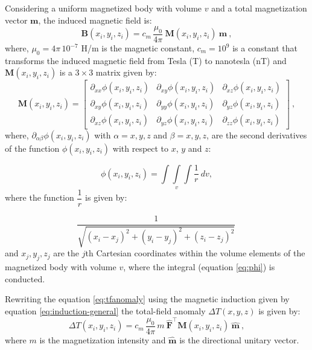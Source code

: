 Considering a uniform magnetized body with volume $v$ and a total magnetization vector $\mathbf{m}$, the induced magnetic field is:
\begin{equation}
	\mathbf{B}(x_i, y_i, z_i) = c_{m} \, \frac{\mu_{0}}{4\pi} \: \mathbf{M}(x_i, y_i, z_i) \: 
	\mathbf{m} \: ,
	\label{eq:induction-general}
\end{equation}
where, $\mu_{0} = 4\pi \, 10^{-7}$ H/m is the magnetic constant, 
$c_{m} = 10^{9}$ is a constant that transforms the induced magnetic field from Tesla (T) to nanotesla (nT) and 
$\mathbf{M}(x_i, y_i, z_i)$ is a $3 \times 3$ matrix given by:
\begin{equation}
	\mathbf{M}(x_i, y_i, z_i) =
	\left[
	\begin{array}{ccc}
		\partial_{xx} \phi(x_i,y_i,z_i) & \partial_{xy} \phi(x_i,y_i,z_i) & 
		\partial_{xz} \phi(x_i,y_i,z_i) \\
		\partial_{xy} \phi(x_i,y_i,z_i) & \partial_{yy} \phi(x_i,y_i,z_i) & 
		\partial_{yz} \phi(x_i,y_i,z_i) \\
		\partial_{xz} \phi(x_i,y_i,z_i) & \partial_{yz} \phi(x_i,y_i,z_i) & 
		\partial_{zz} \phi(x_i,y_i,z_i)
	\end{array}
	\right] \: ,
	\label{eq:M}
\end{equation}
where, $\partial_{\alpha\beta} \phi(x_i,y_i,z_i)$ with $\alpha = x, y, z$ and 
$\beta = x, y, z$, are the second derivatives of the function $\phi(x_i,y_i,z_i)$
with respect to $x$, $y$ and $z$:

\begin{equation}
	\phi(x_i,y_i,z_i) = \int\int\limits_{v}\int \frac{1}{r} \: dv,
	\label{eq:phi}
\end{equation}
where the function $\dfrac{1}{r}$ is given by:

\begin{equation}
	\dfrac{1}{\sqrt{(x_i - x_j)^{2} + 
			(y_i - y_j)^{2} + (z_i - z_j)^{2}}} \,
	\label{eq:r}
\end{equation}
and $x_j, y_j, z_j$ are the $j$th Cartesian coordinates within the volume elements of the magnetized body with volume $v$, where the integral (equation \ref{eq:phi}) is conducted.

Rewriting the equation \ref{eq:tfanomaly} using the magnetic induction given by equation \ref{eq:induction-general} the total-field anomaly $\Delta T(x, y, z)$ is given by:
\begin{equation}
\Delta T(x_i, y_i, z_i) = c_{m} \, \frac{\mu_{0}}{4\pi} \, m \: \hat{\mathbf{F}}^{\top} 
\mathbf{M}(x_i, y_i, z_i) \: \hat{\mathbf{m}} \: ,
\label{eq:tfanomaly-general}
\end{equation}
where $m$ is the magnetization intensity and $\hat{\mathbf{m}}$ is the directional unitary vector.

